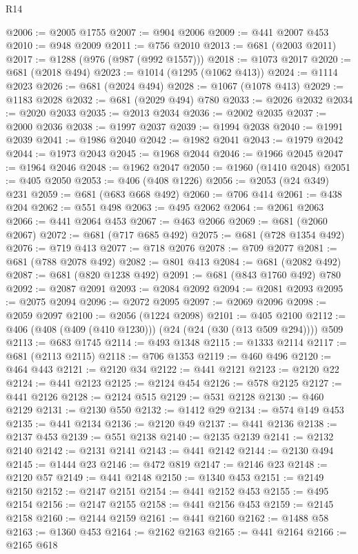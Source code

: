 \begin{lexlean}{R14}
\begin{coremodule}
@2006 := @2005 @1755
@2007 := @904 @2006
@2009 := @441 @2007 @453
@2010 := @948 @2009
@2011 := @756 @2010
@2013 := @681 (@2003 @2011)
@2017 := @1288 (@976 (@987 (@992 @1557)))
@2018 := @1073 @2017
@2020 := @681 (@2018 @494)
@2023 := @1014 (@1295 (@1062 @413))
@2024 := @1114 @2023
@2026 := @681 (@2024 @494)
@2028 := @1067 (@1078 @413)
@2029 := @1183 @2028
@2032 := @681 (@2029 @494) @780
@2033 := @2026 @2032
@2034 := @2020 @2033
@2035 := @2013 @2034
@2036 := @2002 @2035
@2037 := @2000 @2036
@2038 := @1997 @2037
@2039 := @1994 @2038
@2040 := @1991 @2039
@2041 := @1986 @2040
@2042 := @1982 @2041
@2043 := @1979 @2042
@2044 := @1973 @2043
@2045 := @1968 @2044
@2046 := @1966 @2045
@2047 := @1964 @2046
@2048 := @1962 @2047
@2050 := @1960 (@1410 @2048)
@2051 := @405 @2050
@2053 := @406 (@408 @1226)
@2056 := @2053 (@24 @349) @231
@2059 := @681 (@683 @668 @492)
@2060 := @706 @414
@2061 := @438 @204
@2062 := @551 @498
@2063 := @495 @2062
@2064 := @2061 @2063
@2066 := @441 @2064 @453
@2067 := @463 @2066
@2069 := @681 (@2060 @2067)
@2072 := @681 (@717 @685 @492)
@2075 := @681 (@728 @1354 @492)
@2076 := @719 @413
@2077 := @718 @2076
@2078 := @709 @2077
@2081 := @681 (@788 @2078 @492)
@2082 := @801 @413
@2084 := @681 (@2082 @492)
@2087 := @681 (@820 @1238 @492)
@2091 := @681 (@843 @1760 @492) @780
@2092 := @2087 @2091
@2093 := @2084 @2092
@2094 := @2081 @2093
@2095 := @2075 @2094
@2096 := @2072 @2095
@2097 := @2069 @2096
@2098 := @2059 @2097
@2100 := @2056 (@1224 @2098)
@2101 := @405 @2100
@2112 := @406 (@408 (@409 (@410 @1230))) (@24 (@24 (@30 (@13 @509 @294)))) @509
@2113 := @683 @1745
@2114 := @493 @1348
@2115 := @1333 @2114
@2117 := @681 (@2113 @2115)
@2118 := @706 @1353
@2119 := @460 @496
@2120 := @464 @443
@2121 := @2120 @34
@2122 := @441 @2121
@2123 := @2120 @22
@2124 := @441 @2123
@2125 := @2124 @454
@2126 := @578 @2125
@2127 := @441 @2126
@2128 := @2124 @515
@2129 := @531 @2128
@2130 := @460 @2129
@2131 := @2130 @550
@2132 := @1412 @29
@2134 := @574 @149 @453
@2135 := @441 @2134
@2136 := @2120 @49
@2137 := @441 @2136
@2138 := @2137 @453
@2139 := @551 @2138
@2140 := @2135 @2139
@2141 := @2132 @2140
@2142 := @2131 @2141
@2143 := @441 @2142
@2144 := @2130 @494
@2145 := @1444 @23
@2146 := @472 @819
@2147 := @2146 @23
@2148 := @2120 @57
@2149 := @441 @2148
@2150 := @1340 @453
@2151 := @2149 @2150
@2152 := @2147 @2151
@2154 := @441 @2152 @453
@2155 := @495 @2154
@2156 := @2147 @2155
@2158 := @441 @2156 @453
@2159 := @2145 @2158
@2160 := @2144 @2159
@2161 := @441 @2160
@2162 := @1488 @58
@2163 := @1360 @453
@2164 := @2162 @2163
@2165 := @441 @2164
@2166 := @2165 @618

\end{coremodule}
\end{lexlean}
